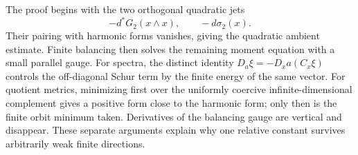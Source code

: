 The proof begins with the two orthogonal quadratic jets
\[
 -d^*G_2(x\wedge x),\qquad -d\sigma_2(x).
\]
Their pairing with harmonic forms vanishes, giving the quadratic
ambient estimate. Finite balancing then solves the remaining moment
equation with a small parallel gauge. For spectra, the distinct identity
$D_a\xi=-D_xa(C_x\xi)$ controls the off-diagonal Schur term by the
finite energy of the same vector. For quotient metrics, minimizing
first over the uniformly coercive infinite-dimensional complement
gives a positive form close to the harmonic form; only then is the
finite orbit minimum taken. Derivatives of the balancing gauge are
vertical and disappear. These separate arguments explain why one
relative constant survives arbitrarily weak finite directions.

